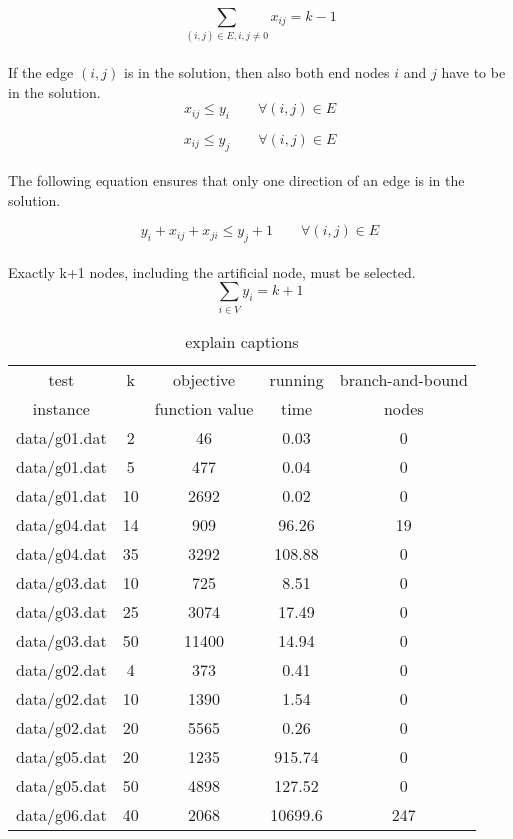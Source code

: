 \begin{equation}
  \sum_{(i, j) \in E, i,j \neq 0}  x_{ij} = k-1
\end{equation}
\\
If the edge $(i,j)$ is in the solution, then also both end nodes $i$ and $j$ 
have to be in the solution.
\begin{equation}
  x_{ij} \leq y_{i} \qquad \forall (i,j) \in E
  \label{lbl:xy1}
\end{equation}

\begin{equation}
  x_{ij} \leq y_{j} \qquad \forall (i,j) \in E
  \label{lbl:xy2}
\end{equation}
\\
The following equation ensures that only one direction of an edge is in the solution.

\begin{equation}
 y_{i} + x_{ij} + x_{ji} \leq y_{j} + 1 \qquad \forall (i,j) \in E
 \label{lbl:xy3}
\end{equation}
\\
Exactly k+1 nodes, including the artificial node, must be selected.
\begin{equation}
  \sum_{i \in V} y_i = k + 1
  \label{lbl:yk}
\end{equation}

\begin{table} 
\small
\centering
\begin{tabular}{ccccc}
\hline
test     & k & objective      & running & branch-and-bound \\
instance &   & function value & time    & nodes \\
\hline
data/g01.dat		& 2	& 46	& 0.03	& 0	\\ 
data/g01.dat		& 5	& 477	& 0.04	& 0	\\ 
data/g01.dat		& 10	& 2692	& 0.02	& 0	\\ 
data/g04.dat		& 14	& 909	& 96.26	& 19	\\ 
data/g04.dat		& 35	& 3292	& 108.88	& 0	\\ 
data/g03.dat		& 10	& 725	& 8.51	& 0	\\ 
data/g03.dat		& 25	& 3074	& 17.49	& 0	\\ 
data/g03.dat		& 50	& 11400	& 14.94	& 0	\\ 
data/g02.dat		& 4	& 373	& 0.41	& 0	\\ 
data/g02.dat		& 10	& 1390	& 1.54	& 0	\\ 
data/g02.dat		& 20	& 5565	& 0.26	& 0	\\ 
data/g05.dat		& 20	& 1235	& 915.74	& 0	\\ 
data/g05.dat		& 50	& 4898	& 127.52	& 0	\\ 
data/g06.dat		& 40	& 2068	& 10699.6	& 247	\\ 
\hline
\end{tabular}
\caption{explain captions}
\label{tbl:scf_fast}
\end{table}
